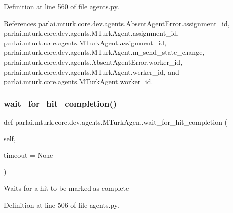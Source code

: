 Definition at line 560 of file agents.\+py.



References parlai.\+mturk.\+core.\+dev.\+agents.\+Absent\+Agent\+Error.\+assignment\+\_\+id, parlai.\+mturk.\+core.\+dev.\+agents.\+M\+Turk\+Agent.\+assignment\+\_\+id, parlai.\+mturk.\+core.\+agents.\+M\+Turk\+Agent.\+assignment\+\_\+id, parlai.\+mturk.\+core.\+dev.\+agents.\+M\+Turk\+Agent.\+m\+\_\+send\+\_\+state\+\_\+change, parlai.\+mturk.\+core.\+dev.\+agents.\+Absent\+Agent\+Error.\+worker\+\_\+id, parlai.\+mturk.\+core.\+dev.\+agents.\+M\+Turk\+Agent.\+worker\+\_\+id, and parlai.\+mturk.\+core.\+agents.\+M\+Turk\+Agent.\+worker\+\_\+id.

\mbox{\label{classparlai_1_1mturk_1_1core_1_1dev_1_1agents_1_1MTurkAgent_a0e59979d8423f514f4c29dd169c21fda}} 
\subsubsection{\texorpdfstring{wait\+\_\+for\+\_\+hit\+\_\+completion()}{wait\_for\_hit\_completion()}}
{\footnotesize\ttfamily def parlai.\+mturk.\+core.\+dev.\+agents.\+M\+Turk\+Agent.\+wait\+\_\+for\+\_\+hit\+\_\+completion (\begin{DoxyParamCaption}\item[{}]{self,  }\item[{}]{timeout = {\ttfamily None} }\end{DoxyParamCaption})}

\begin{DoxyVerb}Waits for a hit to be marked as complete\end{DoxyVerb}
 

Definition at line 506 of file agents.\+py.



